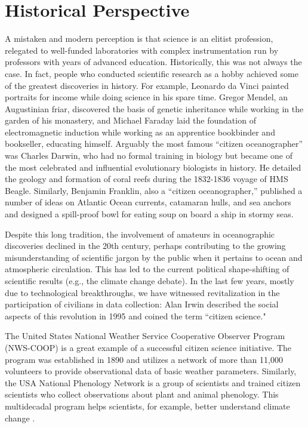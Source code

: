\section{Historical Perspective}

A mistaken and modern perception is that science is an elitist profession, relegated to well-funded laboratories with complex instrumentation run by professors with years of advanced education. Historically, this was not always the case. In fact, people who conducted scientific research as a hobby achieved some of the greatest discoveries in history. For example, Leonardo da Vinci painted portraits for income while doing science in his spare time. Gregor Mendel, an Augustinian friar, discovered the basis of genetic inheritance while working in the garden of his monastery, and Michael Faraday laid the foundation of electromagnetic induction while working as an apprentice bookbinder and bookseller, educating himself. Arguably the most famous ``citizen oceanographer'' was Charles Darwin, who had no formal training in biology but became one of the most celebrated and influential evolutionary biologists in history. He detailed the geology and formation of coral reefs during the 1832-1836 voyage of HMS Beagle. Similarly, Benjamin Franklin, also a ``citizen oceanographer,'' published a number of ideas on Atlantic Ocean currents, catamaran hulls, and sea anchors and designed a spill-proof bowl for eating soup on board a ship in stormy seas.

Despite this long tradition, the involvement of amateurs in oceanographic discoveries declined in the 20th century, perhaps contributing to the growing misunderstanding of scientific jargon by the public when it pertains to ocean and atmospheric circulation. This has led to the current political shape-shifting of scientific results (e.g., the climate change debate). In the last few years, mostly due to technological breakthroughs, we have witnessed revitalization in the participation of civilians in data collection: Alan Irwin described the social aspects of this revolution in 1995 \cite{irwin1995citizen} and coined the term ``citizen science."

The United States National Weather Service Cooperative Observer Program (NWS-COOP) is a great example of a successful citizen science initiative. The program was established in 1890 and utilizes a network of more than 11,000 volunteers to provide observational data of basic weather parameters. Similarly, the USA National Phenology Network is a group of scientists and trained citizen scientists who collect observations about plant and animal phenology. This multidecadal program helps scientists, for example, better understand climate change \cite{ault2013false}.

